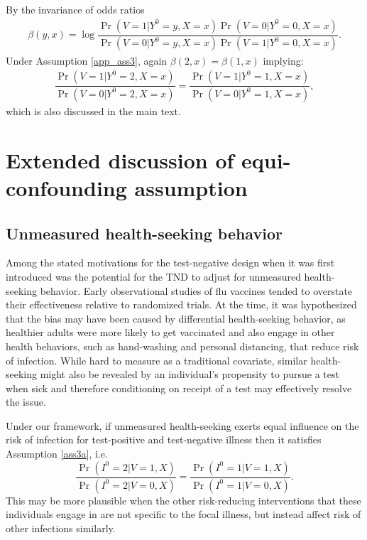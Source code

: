 \begin{appendix}
\begin{refsection}
By the invariance of odds ratios 
\begin{align*}
    \beta(y, x) = \log \dfrac{\Pr(V = 1 | Y^0 = y, X = x)\Pr(V = 0 | Y^0 = 0, X = x)}{\Pr(V = 0 | Y^0 = y, X = x)\Pr(V = 1 | Y^0 = 0, X = x)}.
\end{align*}
Under Assumption \ref{app_ass3}, again $\beta(2, x) = \beta(1, x)$ implying: 
\begin{align*}
    \dfrac{\Pr(V = 1 | Y^0 = 2, X = x)}{\Pr(V = 0 | Y^0 = 2, X = x)} = \dfrac{\Pr(V = 1 | Y^0 = 1, X = x)}{\Pr(V = 0 | Y^0 = 1, X = x)},
\end{align*}
which is also discussed in the main text. 


\newpage 
\section{Extended discussion of equi-confounding assumption}\label{sec:mechanisms}

    \subsection{Unmeasured health-seeking behavior}
    Among the stated motivations for the test-negative design when it was first introduced was the potential for the TND to adjust for unmeasured health-seeking behavior. Early observational studies of flu vaccines tended to overstate their effectiveness relative to randomized trials. At the time, it was hypothesized that the bias may have been caused by differential health-seeking behavior, as healthier adults were more likely to get vaccinated and also engage in other health behaviors, such as hand-washing and personal distancing, that reduce risk of infection. While hard to measure as a traditional covariate, similar health-seeking might also be revealed by an individual's propensity to pursue a test when sick and therefore conditioning on receipt of a test may effectively resolve the issue.
    
    Under our framework, if unmeasured health-seeking exerts equal influence on the risk of infection for test-positive and test-negative illness then it satisfies Assumption \ref{ass3a}, i.e.
    \[\dfrac{\Pr(I^0=2|V=1,X)}{\Pr(I^0=2|V=0,X)}=\dfrac{\Pr(I^0=1|V=1,X)}{\Pr(I^0=1|V=0,X)}.\]
    This may be more plausible when the other risk-reducing interventions that these individuals engage in are not specific to the focal illness, but instead affect risk of other infections similarly. 
    

\end{refsection}
\end{appendix}
